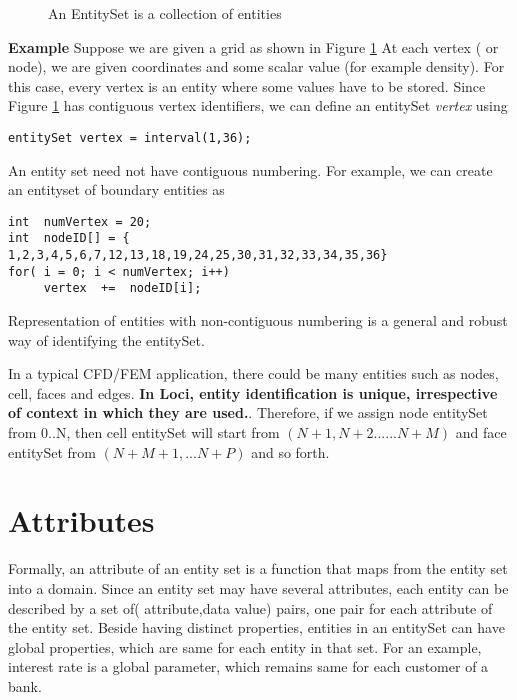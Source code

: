 


%
\begin{figure}[ht]
\vspace{3.5in}\caption { An EntitySet is a collection of entities}
\label {FigEntitySet}
\end{figure}
%
\par{\bf Example} Suppose we are given a grid as shown in Figure \ref{FigEntitySet}
At each vertex ( or node), we are given coordinates and some scalar value
(for example density). For this case, every vertex is an entity where
some values have to be stored. 
%
Since Figure \ref{FigEntitySet} has contiguous vertex identifiers, we can define an
entitySet {\em vertex} using 
\begin{verbatim}
entitySet vertex = interval(1,36);
\end{verbatim}

An entity set need not have contiguous numbering. For example, we can create an entityset
of boundary entities as

\begin{verbatim}
int  numVertex = 20;
int  nodeID[] = { 1,2,3,4,5,6,7,12,13,18,19,24,25,30,31,32,33,34,35,36}
for( i = 0; i < numVertex; i++)
     vertex  +=  nodeID[i];
\end{verbatim}

Representation of entities with non-contiguous numbering is a general and robust 
way of identifying the entitySet.

\par In a typical CFD/FEM application, there could be many entities such as nodes, cell, 
faces and edges.  {\bf In Loci, entity identification is unique, irrespective
of context in which they are used.}. Therefore, if we assign node entitySet from 0..N,
then cell entitySet will start from $(N+1, N+2......N+M)$ and face entitySet from $(N+M+1,...N+P)$
and so forth.

\section { Attributes }

%
\par Formally, an attribute of an entity set is a function that maps from the entity
set into a domain. Since an entity set may have several attributes, each entity
can be described by a set of( attribute,data value) pairs, one pair for 
each attribute of the entity set. 
%
Beside having distinct properties, entities in an entitySet can have global
properties, which are same for each entity in that set. For an example, 
interest rate is a global parameter, which remains same for each customer
of a bank. 

